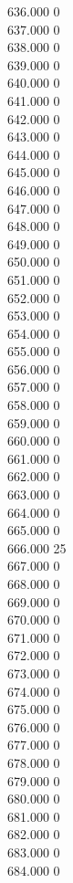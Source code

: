 { 636.000	0 \\
 637.000	0 \\
 638.000	0 \\
 639.000	0 \\
 640.000	0 \\
 641.000	0 \\
 642.000	0 \\
 643.000	0 \\
 644.000	0 \\
 645.000	0 \\
 646.000	0 \\
 647.000	0 \\
 648.000	0 \\
 649.000	0 \\
 650.000	0 \\
 651.000	0 \\
 652.000	0 \\
 653.000	0 \\
 654.000	0 \\
 655.000	0 \\
 656.000	0 \\
 657.000	0 \\
 658.000	0 \\
 659.000	0 \\
 660.000	0 \\
 661.000	0 \\
 662.000	0 \\
 663.000	0 \\
 664.000	0 \\
 665.000	0 \\
 666.000	25 \\
 667.000	0 \\
 668.000	0 \\
 669.000	0 \\
 670.000	0 \\
 671.000	0 \\
 672.000	0 \\
 673.000	0 \\
 674.000	0 \\
 675.000	0 \\
 676.000	0 \\
 677.000	0 \\
 678.000	0 \\
 679.000	0 \\
 680.000	0 \\
 681.000	0 \\
 682.000	0 \\
 683.000	0 \\
 684.000	0 \\
}
